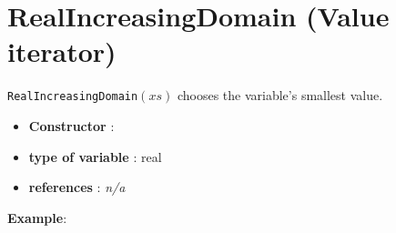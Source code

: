 \section{RealIncreasingDomain (Value iterator)}\label{realincreasingdomain:realincreasingdomainvaliterator}\hypertarget{realincreasingdomain:realincreasingdomainvaliterator}{}
\begin{notedef}
  \texttt{RealIncreasingDomain}$(xs)$ chooses the variable's smallest value.
\end{notedef}

\begin{itemize}
	\item \textbf{Constructor} : 
	\item \textbf{type of variable} : real
	\item \textbf{references} : \emph{n/a}
\end{itemize}

\textbf{Example}:
%

